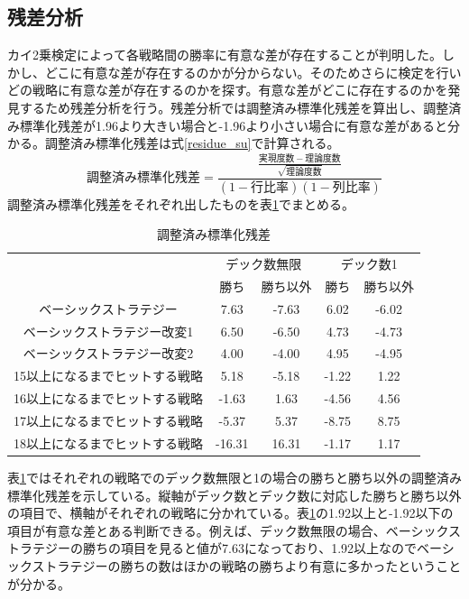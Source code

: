 \subsection{残差分析}
カイ2乗検定によって各戦略間の勝率に有意な差が存在することが判明した。しかし、どこに有意な差が存在するのかが分からない。そのためさらに検定を行いどの戦略に有意な差が存在するのかを探す。有意な差がどこに存在するのかを発見するため残差分析を行う。残差分析では調整済み標準化残差を算出し、調整済み標準化残差が1.96より大きい場合と-1.96より小さい場合に有意な差があると分かる。調整済み標準化残差は式\ref{residue_su}で計算される。
\begin{equation} 調整済み標準化残差 =  \frac{\frac{実現度数 - 理論度数}{\sqrt{理論度数}}}{(1-行比率)(1-列比率)} \label{residue_su}\end{equation}
調整済み標準化残差をそれぞれ出したものを表\ref{residue}でまとめる。
\begin{table}[H]
 \caption{調整済み標準化残差\label{residue}}
 \begin{center}
  \begin{tabular}{|c|c|c|c|c|}
    \hline
     & \multicolumn{2}{c|}{デック数無限} & \multicolumn{2}{c|}{デック数1} \\
    \cline{2-5} & 勝ち & 勝ち以外 & 勝ち & 勝ち以外 \\
    \hline ベーシックストラテジー & 7.63 & -7.63 & 6.02 & -6.02  \\
    \hline ベーシックストラテジー改変1 & 6.50 & -6.50 & 4.73 & -4.73  \\
    \hline ベーシックストラテジー改変2 & 4.00 & -4.00 & 4.95 & -4.95  \\
    \hline 15以上になるまでヒットする戦略 & 5.18 & -5.18 & -1.22 & 1.22  \\
    \hline 16以上になるまでヒットする戦略 & -1.63 & 1.63 & -4.56 & 4.56  \\
    \hline 17以上になるまでヒットする戦略 & -5.37 & 5.37 & -8.75 & 8.75  \\
    \hline 18以上になるまでヒットする戦略 & -16.31 & 16.31 & -1.17 & 1.17  \\
    \hline
  \end{tabular}
 \end{center}
\end{table}
表\ref{residue}ではそれぞれの戦略でのデック数無限と1の場合の勝ちと勝ち以外の調整済み標準化残差を示している。縦軸がデック数とデック数に対応した勝ちと勝ち以外の項目で、横軸がそれぞれの戦略に分かれている。表\ref{residue}の1.92以上と-1.92以下の項目が有意な差とある判断できる。例えば、デック数無限の場合、ベーシックストラテジーの勝ちの項目を見ると値が7.63になっており、1.92以上なのでベーシックストラテジーの勝ちの数はほかの戦略の勝ちより有意に多かったということが分かる。

